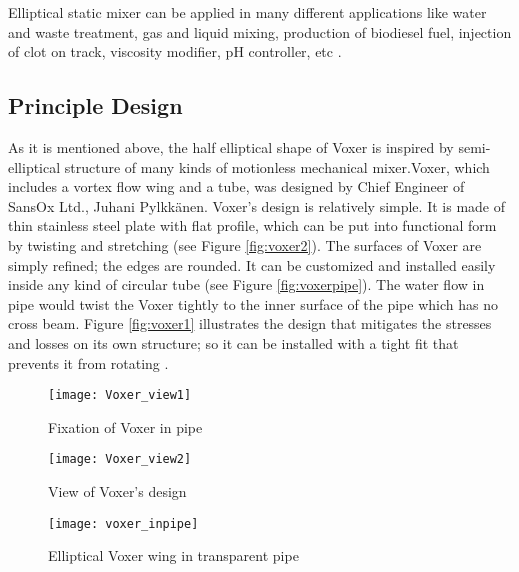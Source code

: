 Elliptical static mixer can be applied in many different applications like water and waste treatment, gas and liquid mixing, production of biodiesel fuel, injection of clot on track, viscosity modifier, pH controller, etc \cite{static:web}. 
\subsection{Principle Design}
As it is mentioned above, the half elliptical shape of Voxer is inspired by semi-elliptical structure of many kinds of motionless mechanical mixer.Voxer, which includes a vortex flow wing and a tube, was designed by Chief Engineer of SansOx Ltd., Juhani Pylkkänen. Voxer's design is relatively simple. It is made of thin stainless steel plate with flat profile, which can be put into functional form by twisting and stretching (see Figure \vref{fig:voxer2}). The surfaces of Voxer are simply refined; the edges are rounded. It can be customized and installed easily inside any kind of circular tube (see Figure \vref{fig:voxerpipe}). The water flow in pipe would twist the Voxer tightly to the inner surface of the pipe which has no cross beam. Figure \vref{fig:voxer1} illustrates the design that mitigates the stresses and losses on its own structure; so it can be installed with a tight fit that prevents it from rotating \cite{voxer:article}.

\begin{figure}[h]
  \centering
  \texttt{[image: Voxer\_view1]}
  \caption{ Fixation of Voxer in pipe \cite{voxer:article}}
  \label{fig:voxer1}
\end{figure}

\begin{figure}[h]
  \centering
  \texttt{[image: Voxer\_view2]}
  \caption{ View of Voxer's design \cite{voxer:article}}
  \label{fig:voxer2}
\end{figure}

\begin{figure}[h]
  \centering
  \texttt{[image: voxer\_inpipe]}
  \caption{ Elliptical Voxer wing in transparent pipe}
  \label{fig:voxerpipe}
\end{figure}
